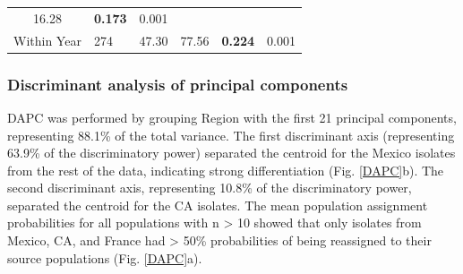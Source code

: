 \documentclass[fleqn,10pt,lineno]{wlpeerj} %
\theoremstyle{definition}
\theoremstyle{definition}
\theoremstyle{definition}
\theoremstyle{remark}
\begin{document}
\begin{longtable}[]{@{}clrllc@{}}
\begin{minipage}[t]{0.13\columnwidth}
16.28\strut
\end{minipage} & \begin{minipage}[t]{0.19\columnwidth}\raggedright\strut
\textbf{0.173}\strut
\end{minipage} & \begin{minipage}[t]{0.07\columnwidth}\centering\strut
0.001\strut
\end{minipage}\tabularnewline
\begin{minipage}[t]{0.32\columnwidth}\centering\strut
Within Year\strut
\end{minipage} & \begin{minipage}[t]{0.06\columnwidth}\raggedright\strut
274\strut
\end{minipage} & \begin{minipage}[t]{0.07\columnwidth}\raggedleft\strut
47.30\strut
\end{minipage} & \begin{minipage}[t]{0.13\columnwidth}\raggedright\strut
77.56\strut
\end{minipage} & \begin{minipage}[t]{0.19\columnwidth}\raggedright\strut
\textbf{0.224}\strut
\end{minipage} & \begin{minipage}[t]{0.07\columnwidth}\centering\strut
0.001\strut
\end{minipage}\tabularnewline
\bottomrule
\end{longtable}

\newpage

\subsubsection*{Discriminant analysis of principal
components}\label{discriminant-analysis-of-principal-components}

DAPC was performed by grouping Region with the first 21 principal
components, representing 88.1\% of the total variance. The first
discriminant axis (representing 63.9\% of the discriminatory power)
separated the centroid for the Mexico isolates from the rest of the
data, indicating strong differentiation (Fig. \ref{DAPC}b). The second
discriminant axis, representing 10.8\% of the discriminatory power,
separated the centroid for the CA isolates. The mean population
assignment probabilities for all populations with n \textgreater{} 10
showed that only isolates from Mexico, CA, and France had \textgreater{}
50\% probabilities of being reassigned to their source populations (Fig.
\ref{DAPC}a).
\end{document}
